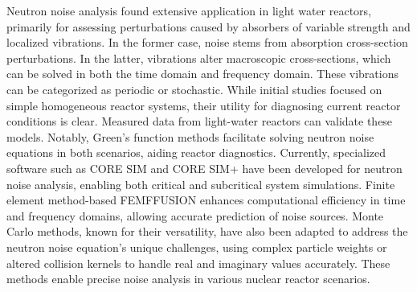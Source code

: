 Neutron noise analysis found extensive application in light water reactors, primarily for assessing perturbations caused by absorbers of variable strength and localized vibrations. In the former case, noise stems from absorption cross-section perturbations. In the latter, vibrations alter macroscopic cross-sections, which can be solved in both the time domain and frequency domain. These vibrations can be categorized as periodic or stochastic. While initial studies focused on simple homogeneous reactor systems, their utility for diagnosing current reactor conditions is clear. Measured data from light-water reactors can validate these models. Notably, Green’s function methods facilitate solving neutron noise equations in both scenarios, aiding reactor diagnostics.
Currently, specialized software such as CORE SIM and CORE SIM+ have been developed for neutron noise analysis, enabling both critical and subcritical system simulations. Finite element method-based FEMFFUSION enhances computational efficiency in time and frequency domains, allowing accurate prediction of noise sources. Monte Carlo methods, known for their versatility, have also been adapted to address the neutron noise equation’s unique challenges, using complex particle weights or altered collision kernels to handle real and imaginary values accurately. These methods enable precise noise analysis in various nuclear reactor scenarios.
